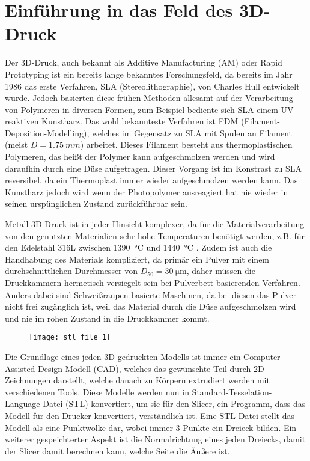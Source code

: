 \documentclass[main.tex]{subfiles}
\begin{document}
\section{Einführung in das Feld des 3D-Druck}
Der 3D-Druck, auch bekannt als Additive Manufacturing (AM) oder Rapid Prototyping ist ein bereits lange bekanntes Forschungsfeld, da bereits im Jahr 1986 das erste Verfahren, SLA (Stereolithographie), von Charles Hull entwickelt wurde. Jedoch basierten diese frühen Methoden allesamt auf der Verarbeitung von Polymeren in diversen Formen, zum Beispiel bediente sich SLA einem UV-reaktiven Kunstharz. Das wohl bekannteste Verfahren ist FDM (Filament-Deposition-Modelling), welches im Gegensatz zu SLA mit Spulen an Filament (meist $D=\qty{1.75}{mm}$) arbeitet. Dieses Filament besteht aus thermoplastischen Polymeren, das heißt der Polymer kann aufgeschmolzen werden und wird daraufhin durch eine Düse aufgetragen. Dieser Vorgang ist im Konstrast zu SLA reversibel, da ein Thermoplast immer wieder aufgeschmolzen werden kann.\parencite{BHATIA20231060} Das Kunstharz jedoch wird wenn der Photopolymer ausreagiert hat nie wieder in seinen urspünglichen Zustand zurückführbar sein.\parencite{FACUNDO_1}

Metall-3D-Druck ist in jeder Hinsicht komplexer, da für die Materialverarbeitung von den genutzten Materialien sehr hohe Temperaturen benötigt werden, z.B. für den Edelstahl 316L zwischen \qty{1390}{\celsius} und \qty{1440}{\degreeCelsius} \parencite{610LSTEEL}. Zudem ist auch die Handhabung des Materials kompliziert, da primär ein Pulver mit einem durchschnittlichen Durchmesser von $D_{50}=\SI{30}{\micro\meter}$\parencite[~S.3]{ZAKRZEWSKI2020115}, daher müssen die Druckkammern hermetisch versiegelt sein bei Pulverbett-basierenden Verfahren.
Anders dabei sind Schweißraupen-basierte Maschinen, da bei diesen das Pulver nicht frei zugänglich ist, weil das Material durch die Düse aufgeschmolzen wird und nie im rohen Zustand in die Druckkammer kommt.

\begin{figure}[h!]
\begin{center}
	\texttt{[image: stl\_file\_1]}
	\label{img:stl_1}
\end{center}
\end{figure}	

Die Grundlage eines jeden 3D-gedruckten Modells ist immer ein Computer-Assisted-Design-Modell (CAD), welches das gewünschte Teil durch 2D-Zeichnungen darstellt, welche danach zu Körpern extrudiert werden mit verschiedenen Tools. Diese Modelle werden nun in Standard-Tesselation-Language-Datei (STL) konvertiert, um sie für den Slicer, ein Programm, dass das Modell für den Drucker konvertiert, verständlich ist. Eine STL-Datei stellt das Modell als eine Punktwolke dar, wobei immer 3 Punkte ein Dreieck bilden. Ein weiterer gespeichterter Aspekt ist die Normalrichtung eines jeden Dreiecks, damit der Slicer damit berechnen kann, welche Seite die Äußere ist. 
\end{document}
